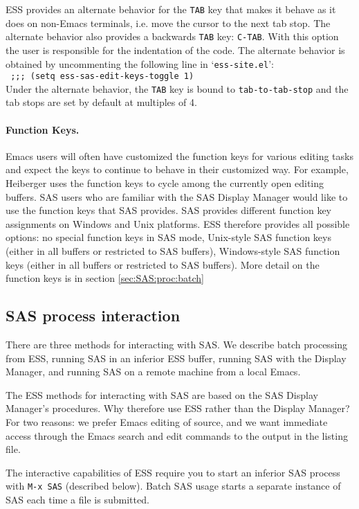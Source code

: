 \documentclass{article}
\newcommand{\stexttt}[1]{{\small\texttt{#1}}}
\newcommand{\elcode}[1]{\\{\stexttt{\hspace*{2em} #1}}\\}
\newcommand{\file}[1]{`\stexttt{#1}'}
\begin{document}
ESS provides an alternate behavior for the \stexttt{TAB} key that makes it
behave as it does on non-Emacs terminals, i.e. move the cursor to the
next tab stop.  The alternate behavior also provides a backwards \stexttt{TAB}
key: \stexttt{C-TAB}.  With this option the user is responsible for the
indentation of the code.  The alternate behavior is obtained by
uncommenting the following line in \file{ess-site.el}:
\elcode{;;; (setq ess-sas-edit-keys-toggle 1)}
Under the alternate behavior, the \stexttt{TAB} key is bound to
\stexttt{tab-to-tab-stop} and the tab stops are set by default at multiples
of 4.

\paragraph{Function Keys.}
Emacs users will often have customized the function keys for various
editing tasks and expect the keys to continue to behave in their
customized way.  For example, Heiberger uses the function keys to
cycle among the currently open editing buffers.  SAS users who are
familiar with the SAS Display Manager would like to use the function
keys that SAS provides.  SAS provides different function key assignments on
Windows and Unix platforms.  ESS therefore provides all possible options: 
no special function keys in SAS mode,
Unix-style SAS function keys (either
in all buffers or restricted to SAS buffers), Windows-style SAS function
keys (either in all buffers or restricted to SAS buffers).
More detail on the function keys is in section \ref{sec:SAS:proc:batch}


\subsection{SAS process interaction}
\label{sec:SAS:proc}

There are three methods for interacting with SAS.  We describe batch
processing from ESS, running SAS in an inferior ESS buffer, running
SAS with the Display Manager, and running SAS on a remote machine from
a local Emacs.

The ESS methods for interacting with SAS are based on the SAS Display
Manager's procedures.  Why therefore use ESS rather than the
Display Manager?   For two reasons: we prefer Emacs editing of source, and we
want immediate access through the Emacs search and edit commands to
the output in the listing file.
 

The interactive capabilities of ESS require you to start an inferior
SAS process with \stexttt{M-x SAS} (described below).  Batch SAS usage
starts a separate instance of SAS each time a file is submitted.
\end{document}
